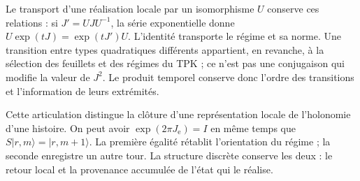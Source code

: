 Le transport d'une réalisation locale par un isomorphisme \(U\) conserve
ces relations : si \(J'=UJU^{-1}\), la série exponentielle donne
\(U\exp(tJ)=\exp(tJ')U\). L'identité transporte le régime et sa
norme. Une transition entre types quadratiques différents appartient, en
revanche, à la sélection des feuillets et des régimes du TPK ; ce n'est pas une conjugaison
qui modifie la valeur de \(J^2\). Le produit temporel conserve donc
l'ordre des transitions et l'information de leurs extrémités.

Cette articulation distingue la clôture d'une représentation locale de
l'holonomie d'une histoire. On peut avoir \(\exp(2\pi J_{\mathrm e})=I\)
en même temps que \(S|r,m\rangle=|r,m+1\rangle\). La première égalité
rétablit l'orientation du régime ; la seconde enregistre un autre tour. La
structure discrète conserve les deux : le retour local et la provenance
accumulée de l'état qui le réalise.

